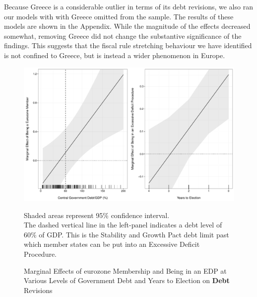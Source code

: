 \documentclass[]{article}
\begin{document}
Because Greece is a considerable outlier in terms of its debt revisions, we also ran our models with with Greece omitted from the sample. The results of these models are shown in the Appendix. While the magnitude of the effects decreased somewhat, removing Greece did not change the substantive significance of the findings. This suggests that the fiscal rule stretching behaviour we have identified is not confined to Greece, but is instead a wider phenomenon in Europe.


\begin{figure}
    \caption{Marginal Effects of eurozone Membership and Being in an EDP at Various Levels of Government Debt and Years to Election on \textbf{Debt} Revisions}
    \label{me_debt_edp_elect}

    \begin{center}
        \includegraphics[scale=0.45]{figures/edp_debt_elect_me.pdf}
    \end{center}

	{\scriptsize{Shaded areas represent 95\% confidence interval.\\
    The dashed vertical line in the left-panel indicates a debt level of 60\% of GDP. This is the Stability and Growth Pact debt limit past which member states can be put into an Excessive Deficit Procedure.}}

\end{figure}
\end{document}
